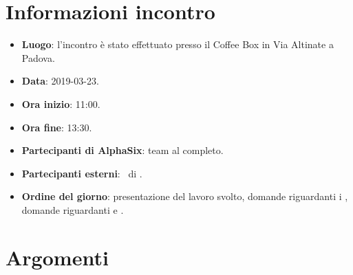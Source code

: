 \newcommand{\documento}{\VE}
\newcommand{\nomedocumentofisico}{VE\_2019-03-23.pdf}
\newcommand{\redazione}{\TG}
\newcommand{\verifica}{\MM}
\newcommand{\approvazione}{\NC}
\newcommand{\versione}{1.0.0}
\newcommand{\uso}{Esterno}
\newcommand{\destinateTo}{\TV, \\ & \RC, \\ & \II}
\newcommand{\datacreazione}{24 marzo 2019}
\newcommand{\datamodifica}{26 marzo 2019}
\newcommand{\stato}{Approvato}

\def\TABELLE{false}	%
\def\FIGURE{false} 	%






    

    

    \section{Informazioni incontro}
    	\begin{itemize}
    		\item \textbf{Luogo}: l'incontro è stato effettuato presso il Coffee Box in Via Altinate a Padova.
    		\item \textbf{Data}: 2019-03-23.
    		\item \textbf{Ora inizio}: 11:00.
    		\item \textbf{Ora fine}: 13:30.
    		\item \textbf{Partecipanti di AlphaSix}: team al completo.
    		\item \textbf{Partecipanti esterni}: \DZ~di \II.
    		\item \textbf{Ordine del giorno}: presentazione del lavoro svolto, domande riguardanti i , domande riguardanti
             e .

    	\end{itemize}

    \section{Argomenti}

